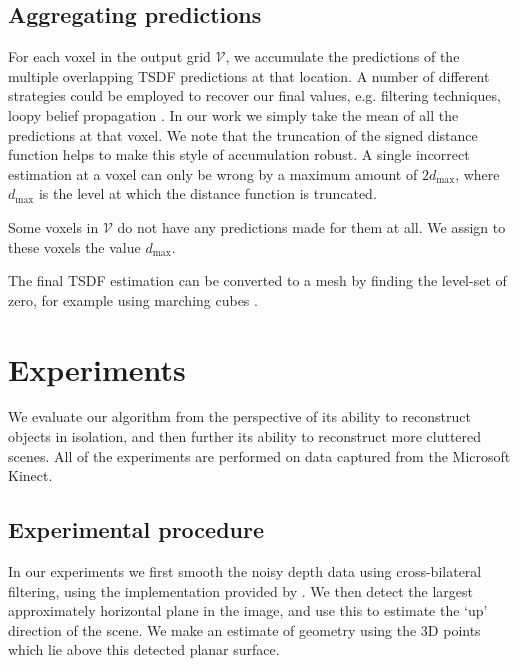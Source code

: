 \documentclass[10pt,twocolumn,letterpaper]{article}
\makeatletter
\renewcommand*{\eg}{e.g.\@\xspace}
\newcommand{\voxelgrid}{\mathcal{V}}
\makeatother
\begin{document}
\subsection{Aggregating predictions}
\label{sec:combining}

For each voxel in the output grid $\voxelgrid$, we accumulate the predictions of the multiple overlapping TSDF predictions at that location.
A number of different strategies could be employed to recover our final values, \eg filtering techniques, loopy belief propagation \etc.
In our work we simply take the mean of all the predictions at that voxel.
We note that the truncation of the signed distance function helps to make this style of accumulation robust.
A single incorrect estimation at a voxel can only be wrong by a maximum amount of $2d_{\max}$, where $d_{\max}$ is the level at which the distance function is truncated.

Some voxels in $\voxelgrid$ do not have any predictions made for them at all.
We assign to these voxels the value $d_{\max}$.

The final TSDF estimation can be converted to a mesh by finding the level-set of zero, for example using marching cubes \cite{lorensen-siggraph-2013}.


\section{Experiments}

We evaluate our algorithm from the perspective of its ability to reconstruct objects in isolation, and then further its ability to reconstruct more cluttered scenes.
All of the experiments are performed on data captured from the Microsoft Kinect.



\subsection{Experimental procedure}

In our experiments we first smooth the noisy depth data using cross-bilateral filtering, using the implementation provided by \cite{silberman-eccv-2012}.
We then detect the largest approximately horizontal plane in the image, and use this to estimate the `up' direction of the scene.
We make an estimate of geometry using the 3D points which lie above this detected planar surface.
\end{document}
